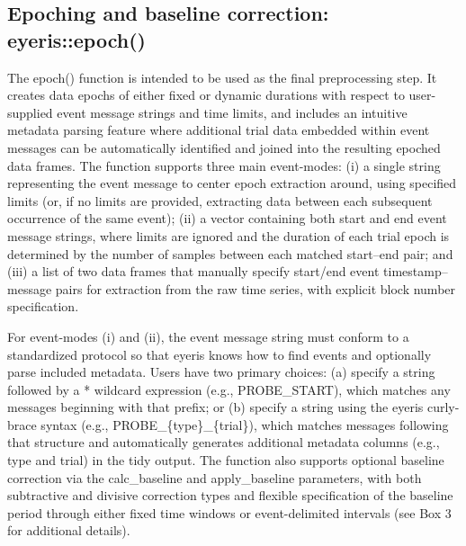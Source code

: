 \subsection{Epoching and baseline correction: eyeris::epoch()}
The epoch() function is intended to be used as the final preprocessing step. It creates data epochs of either fixed or dynamic durations with respect to user-supplied event message strings and time limits, and includes an intuitive metadata parsing feature where additional trial data embedded within event messages can be automatically identified and joined into the resulting epoched data frames. The function supports three main event-modes: (i) a single string representing the event message to center epoch extraction around, using specified limits (or, if no limits are provided, extracting data between each subsequent occurrence of the same event); (ii) a vector containing both start and end event message strings, where limits are ignored and the duration of each trial epoch is determined by the number of samples between each matched start–end pair; and (iii) a list of two data frames that manually specify start/end event timestamp–message pairs for extraction from the raw time series, with explicit block number specification.

For event-modes (i) and (ii), the event message string must conform to a standardized protocol so that eyeris knows how to find events and optionally parse included metadata. Users have two primary choices: (a) specify a string followed by a * wildcard expression (e.g., PROBE\_START\*), which matches any messages beginning with that prefix; or (b) specify a string using the eyeris curly-brace syntax (e.g., PROBE\_\{type\}\_\{trial\}), which matches messages following that structure and automatically generates additional metadata columns (e.g., type and trial) in the tidy output. The function also supports optional baseline correction via the calc\_baseline and apply\_baseline parameters, with both subtractive and divisive correction types and flexible specification of the baseline period through either fixed time windows or event-delimited intervals (see Box 3 for additional details).

